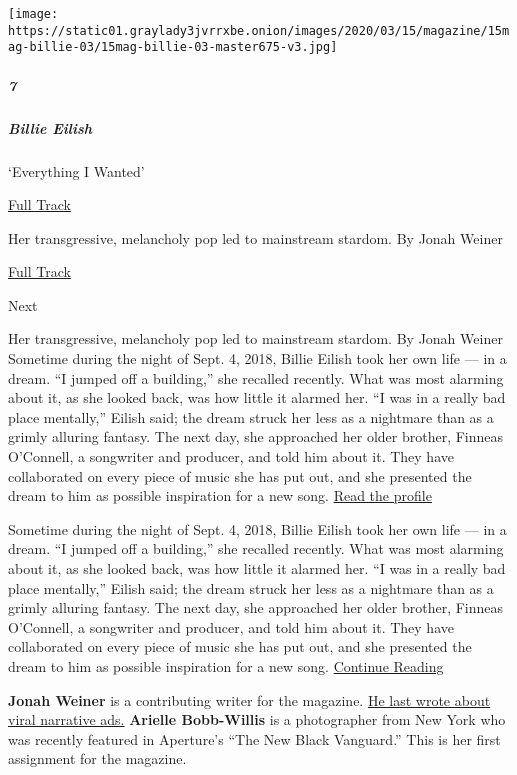\texttt{[image: https://static01.graylady3jvrrxbe.onion/images/2020/03/15/magazine/15mag-billie-03/15mag-billie-03-master675-v3.jpg]}

\hypertarget{7}{%
\subparagraph{7}\label{7}}

\hypertarget{billie-eilish}{%
\subparagraph{Billie Eilish}\label{billie-eilish}}

`Everything I Wanted'

\href{https://open.spotify.com/track/3ZCTVFBt2Brf31RLEnCkWJ}{ Full
Track}

Her transgressive, melancholy pop led to mainstream stardom. By Jonah
Weiner

\href{https://open.spotify.com/track/3ZCTVFBt2Brf31RLEnCkWJ}{Full Track
}

Next

Her transgressive, melancholy pop led to mainstream stardom. By Jonah
Weiner Sometime during the night of Sept. 4, 2018, Billie Eilish took
her own life --- in a dream. ``I jumped off a building,'' she recalled
recently. What was most alarming about it, as she looked back, was how
little it alarmed her. ``I was in a really bad place mentally,'' Eilish
said; the dream struck her less as a nightmare than as a grimly alluring
fantasy. The next day, she approached her older brother, Finneas
O'Connell, a songwriter and producer, and told him about it. They have
collaborated on every piece of music she has put out, and she presented
the dream to him as possible inspiration for a new song.
\href{https://www.nytimes3xbfgragh.onion/interactive/2020/03/11/magazine/billie-eilish-profile.html}{Read
the profile}

Sometime during the night of Sept. 4, 2018, Billie Eilish took her own
life --- in a dream. ``I jumped off a building,'' she recalled recently.
What was most alarming about it, as she looked back, was how little it
alarmed her. ``I was in a really bad place mentally,'' Eilish said; the
dream struck her less as a nightmare than as a grimly alluring fantasy.
The next day, she approached her older brother, Finneas O'Connell, a
songwriter and producer, and told him about it. They have collaborated
on every piece of music she has put out, and she presented the dream to
him as possible inspiration for a new song.
\href{https://www.nytimes3xbfgragh.onion/interactive/2020/03/11/magazine/billie-eilish-profile.html}{Continue
Reading}

\textbf{Jonah Weiner} is a contributing writer for the magazine.
\href{https://www.nytimes3xbfgragh.onion/2020/01/08/magazine/is-the-viral-non-ad-ad-the-future-of-advertising.html}{He
last wrote about viral narrative ads.} \textbf{Arielle Bobb-Willis} is a
photographer from New York who was recently featured in Aperture's ``The
New Black Vanguard.'' This is her first assignment for the magazine.

